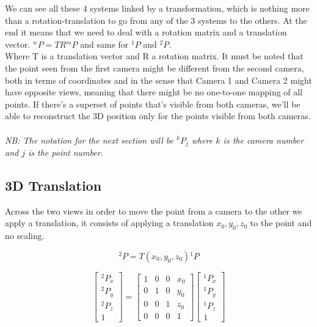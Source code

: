 We can see all these 4 systems linked by a transformation, which is nothing more than a rotation-translation to go from any of the 3 systems to the others. At the end it means that we need to deal with a rotation matrix and a translation vector.
\({}^wP = T R {}^mP\) and same for \({}^1P\) and \({}^2P\).
\\Where T is a translation vector and R a rotation matrix. It must be noted that the point seen from the first camera might be different from the second camera, both in terms of coordinates and in the sense that Camera 1 and Camera 2 might have opposite views, meaning that there might be no one-to-one mapping of all points. If there's a superset of points that's visible from both cameras, we'll be able to reconstruct the 3D position only for the points visible from both cameras.
\\\\\textit{NB: The notation for the next section will be \({}^kP_j\) where \(k\) is the camera number and \(j\) is the point number.}

\subsection{3D Translation}

Across the two views in order to move the point from a camera to the other we apply a translation,
it consists of applying a translation \(x_0, y_0, z_0\) to the point and no scaling.

\[
    {}^2P = T(x_0, y_0, z_0) {}^1P 
\]

\[
    \begin{bmatrix}
        {}^2P_x \\
        {}^2P_y \\
        {}^2P_z \\
        1
    \end{bmatrix}
    =
    \begin{bmatrix}
        1 & 0 & 0 & x_0 \\
        0 & 1 & 0 & y_0 \\
        0 & 0 & 1 & z_0 \\
        0 & 0 & 0 & 1
    \end{bmatrix}
    \begin{bmatrix}
        {}^1P_x \\
        {}^1P_y \\
        {}^1P_z \\
        1
    \end{bmatrix}   
\]

